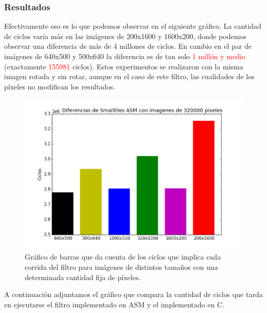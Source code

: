 \subsubsection{Resultados}
\par{Efectivamente eso es lo que podemos observar en el siguiente gráfico. La cantidad de ciclos varía más en las imágenes de 200x1600 y 1600x200, donde podemos observar una diferencia de más de 4 millones de ciclos. En cambio en el par de imágenes de 640x500 y 500x640 la diferencia es de tan solo \textcolor{red}{1 millón y medio} (exactamente \textcolor{red}{155981} ciclos). Estos experimentos se realizaron con la misma imagen rotada y sin rotar, aunque en el caso de este filtro, las cualidades de los píxeles no modifican los resultados.}

\begin{figure}[H]
\centering
\captionsetup{justification=centering}
\includegraphics[width = 15 cm, height = 10 cm]{imagenes/distintostamanos.png}
\caption[center]{Gráfico de barras que da cuenta de los ciclos que implica cada corrida del filtro para imágenes de distintos tamaños con una determinada cantidad fija de píxeles.}
\end{figure}
	
\par{A continuación adjuntamos el gráfico que compara la cantidad de ciclos que tarda en ejecutarse el filtro implementado en ASM y el implementado en C.}

